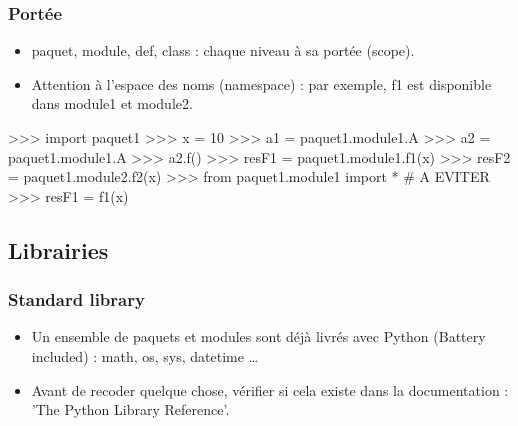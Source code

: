 \begin{frame}[fragile]
\frametitle{Portée}
\begin{minipage}[c]{3cm}
\end{minipage}
\begin{minipage}[c]{6cm}
\begin{itemize}
 \item paquet, module, def, class : chaque niveau à sa portée (scope).
 \item Attention à l'espace des noms (namespace) : par exemple, f1 est disponible dans module1 et module2.    
\end{itemize}
\begin{pythonConsole}
>>> import paquet1
>>> x = 10
>>> a1 = paquet1.module1.A
>>> a2 = paquet1.module1.A
>>> a2.f()
>>> resF1 = paquet1.module1.f1(x)
>>> resF2 = paquet1.module2.f2(x)
>>> from paquet1.module1 import * # A EVITER
>>> resF1 = f1(x)
\end{pythonConsole}
\end{minipage}
\end{frame}
\subsection{Librairies}
\begin{frame}
\frametitle{Standard library}
\begin{itemize}
    \item Un ensemble de paquets et modules sont déjà livrés avec Python (Battery included) : math, os, sys, datetime \dots
    \item Avant de recoder quelque chose, vérifier si cela existe dans la documentation : 'The Python Library Reference'. 
\end{itemize}
\end{frame}
